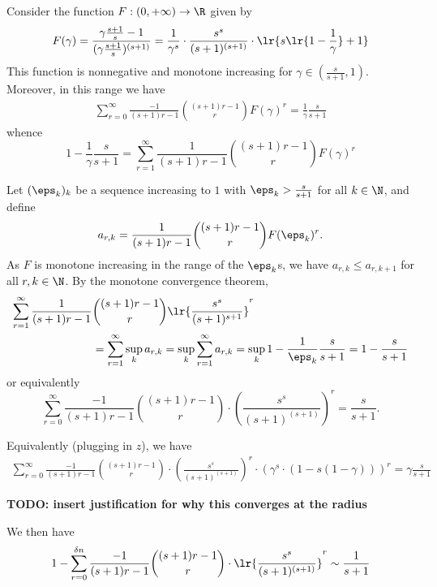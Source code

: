 \documentclass[12pt]{article}
\begin{document}
    \newpage

Consider the function $ F:(0,+\infty)\to \R $ given by
\[
    F(\gamma) = \frac{\gamma \frac{s+1}{s} - 1}{(\gamma \frac{s+1}{s})^{(s+1)}} = \frac{1}{\gamma^s} \cdot \frac{s^s}{(s+1)^{(s+1)}} \cdot \lr{s\lr{1 - \frac{1}{\gamma}} + 1}
\]
This function is nonnegative and monotone increasing for $\gamma \in (\frac{s}{s+1},1) $. Moreover, in this range we have 
\begin{align*}
    \sum_{r=0}^{\infty} \frac{-1}{(s+1)r-1} {(s+1)r - 1 \choose r} F(\gamma)^r = \frac{1}{\gamma} \frac{s}{s+1} 
\end{align*}
whence
\[
    1-\frac{1}{\gamma}\frac{s}{s+1} = \sum_{r=1}^{\infty} \frac{1}{(s+1)r-1} {(s+1)r - 1 \choose r} F( \gamma)^{r}
\]

Let $ (\eps_{k})_{k} $ be a sequence increasing to $ 1 $ with $ \eps_{k}> \frac{s}{s+1} $ for all $ k\in \N $, and define 
\[
    a_{r,k} = \frac{1}{(s+1)r -1} \binom{(s+1)r -1}{r} F(\eps_{k})^{r}.
\]
As $ F $ is monotone increasing in the range of the $ \eps_{k} $s, we have $ a_{r,k}\leq a_{r,k+1} $ for all $ r,k\in \N $. By the monotone convergence theorem,
\begin{align*}
    \sum_{r=1}^{\infty} \frac{1}{(s+1)r-1}&\binom{(s+1)r-1}{r} \lr{\frac{s^{s}}{(s+1)^{s+1}}}^{r} \\
    &=  \sum_{r=1}^{\infty} \sup_{k} a_{r,k}  
    = \sup_{k}\sum_{r=1}^{\infty}  a_{r,k} = \sup_{k} 1- \frac{1}{\eps_{k}} \frac{s}{s+1} = 1-\frac{s}{s+1}
\end{align*}
or equivalently
\begin{equation*}
    \sum_{r=0}^{\infty} \frac{-1}{(s+1)r-1} {(s+1)r - 1 \choose r} \cdot \left( \frac{s^s}{(s+1)^{(s+1)}} \right)^r  = \frac{s}{s+1}.
\end{equation*}



  Equivalently (plugging in $z$), we have
    \begin{equation}\begin{split}
        \sum_{r=0}^{\infty} \frac{-1}{(s+1)r-1} {(s+1)r - 1 \choose r} \cdot \left( \frac{s^s}{(s+1)^{(s+1)}} \right)^r \cdot \left( \gamma^{s} \cdot (1 - s (1 - \gamma)) \right)^r = \gamma \frac{s}{s+1}
    \end{split}\end{equation}


    
    \textbf{TODO: insert justification for why this converges at the radius}


    
    We then have
    \begin{equation}\begin{split}
        1 - \sum_{r=0}^{\delta n} \frac{-1}{(s+1)r-1} {(s+1)r-1 \choose r} \cdot \lr{\frac{s^s}{(s+1)^{(s+1)}}}^{r} \sim \frac{1}{s+1}
    \end{split}\end{equation}
\end{document}
